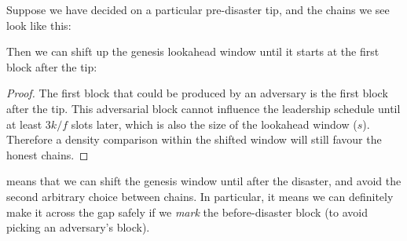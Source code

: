\begin{lemma}
\label{lemma:shift-genesis-window}
Suppose we have decided on a particular pre-disaster tip, and the chains we see
look like this:
%
\begin{center}
\end{center}
%
Then we can shift up the genesis lookahead window until it starts at the
first block after the tip:
%
\begin{center}
\end{center}
\end{lemma}

\begin{proof}
The first block that could be produced by an adversary is the first block after
the tip. This adversarial block cannot influence the leadership schedule until
at least $3k/f$ slots later, which is also the size of the lookahead window
($s$). Therefore a density comparison within the shifted window will still
favour the honest chains.
\end{proof}
%
 means that we can shift the genesis window
until after the disaster, and avoid the second arbitrary choice between chains.
In particular, it means we can definitely make it across the gap safely if we
\emph{mark} the before-disaster block (to avoid picking an adversary's block).

